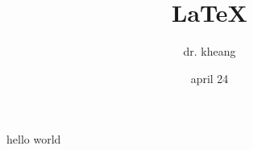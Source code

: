 \documentclass{article}
\title{\LaTeX}
\author{dr. kheang}
\date{april 24}
\begin{document}
	\maketitle
	hello world
	
\end{document}
